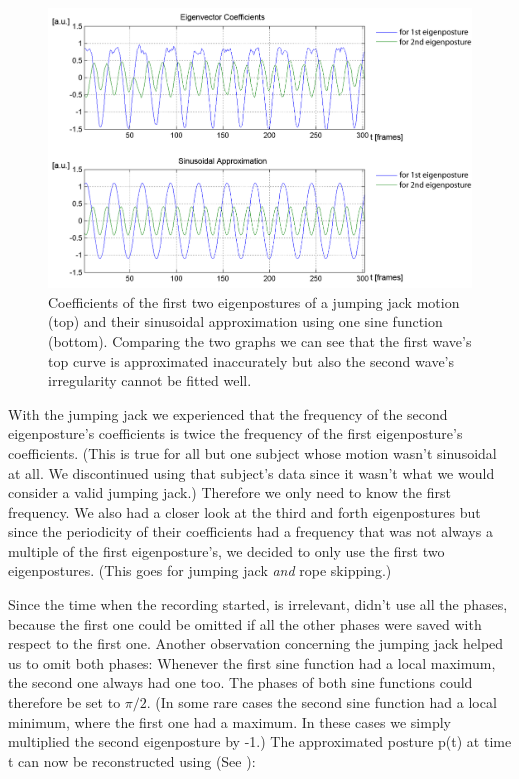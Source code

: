 \documentclass[a4paper]{article}
\begin{document}
\begin{figure}
		\centering
		\includegraphics[width=\textwidth]{1sinHamp.png}
		\caption{Coefficients of the first two eigenpostures of a jumping jack motion (top) and their sinusoidal approximation using one sine function (bottom).
		Comparing the two graphs we can see that the first wave's top curve is approximated inaccurately but also the second wave's irregularity cannot be fitted well.}
		\label{fig:approx}
\end{figure}

With the jumping jack we experienced that the frequency of the second eigenposture's coefficients is twice the frequency of the first eigenposture's coefficients.
(This is true for all but one subject whose motion wasn't sinusoidal at all.
We discontinued using that subject's data since it wasn't what we would consider a valid jumping jack.)
Therefore we only need to know the first frequency.
We also had a closer look at the third and forth eigenpostures but since the periodicity of their coefficients had a frequency that was not always a multiple of the first eigenposture's, we decided to only use the first two eigenpostures. (This goes for jumping jack \emph{and} rope skipping.) 

Since the time when the recording started, is irrelevant, \cite{origin} didn't use all the phases, because the first one could be omitted if all the other phases were saved with respect to the first one.
Another observation concerning the jumping jack helped us to omit both phases:
Whenever the first sine function had a local maximum, the second one always had one too.
The phases of both sine functions could therefore be set to $\pi/2$.
(In some rare cases the second sine function had a local minimum, where the first one had a maximum. In these cases we simply multiplied the second eigenposture by -1.)
The approximated posture p(t) at time t can now be reconstructed using (See \cite{origin}):
\end{document}
